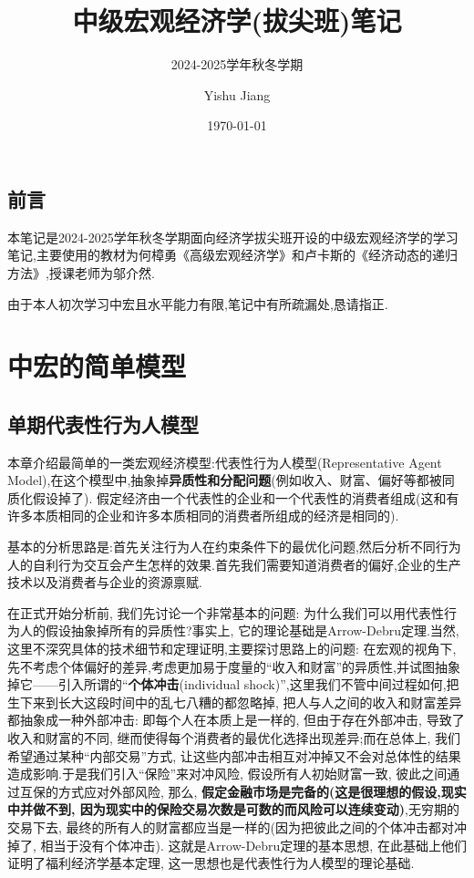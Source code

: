 \documentclass[lang=cn,10pt]{elegantbook}
\title{中级宏观经济学(拔尖班)笔记}
\subtitle{2024-2025学年秋冬学期}
\author{Yishu Jiang}
\institute{School of Economics,Zhejiang University}
\date{\today}
\begin{document}
\maketitle
\frontmatter
\chapter*{前言}
{\fangsong 
    本笔记是2024-2025学年秋冬学期面向经济学拔尖班开设的中级宏观经济学的学习笔记,主要使用的教材为何樟勇《高级宏观经济学》和卢卡斯的《经济动态的递归方法》,授课老师为邬介然.

    由于本人初次学习中宏且水平能力有限,笔记中有所疏漏处,恳请指正.
}
\newpage

\tableofcontents

\mainmatter
\part{中宏的简单模型}
\chapter{单期代表性行为人模型}
本章介绍最简单的一类宏观经济模型:代表性行为人模型(Representative Agent Model),在这个模型中,抽象掉\textbf{异质性和分配问题}(例如收入、财富、偏好等都被同质化假设掉了).
假定经济由一个代表性的企业和一个代表性的消费者组成(这和有许多本质相同的企业和许多本质相同的消费者所组成的经济是相同的).

基本的分析思路是:首先关注行为人在约束条件下的最优化问题,然后分析不同行为人的自利行为交互会产生怎样的效果.首先我们需要知道消费者的偏好,企业的生产技术以及消费者与企业的资源禀赋.

{\kaishu 在正式开始分析前, 我们先讨论一个非常基本的问题: 为什么我们可以用代表性行为人的假设抽象掉所有的异质性?事实上, 它的理论基础是Arrow-Debru定理.当然,这里不深究具体的技术细节和定理证明,主要探讨思路上的问题:
在宏观的视角下,先不考虑个体偏好的差异,考虑更加易于度量的“收入和财富”的异质性,并试图抽象掉它——引入所谓的}“\textbf{个体冲击}(individual shock)”,{\kaishu 这里我们不管中间过程如何,把生下来到长大这段时间中的乱七八糟的都忽略掉, 把人与人之间的收入和财富差异都抽象成一种外部冲击: 即每个人在本质上是一样的, 但由于存在外部冲击, 
导致了收入和财富的不同, 继而使得每个消费者的最优化选择出现差异;而在总体上, 我们希望通过某种“内部交易”方式, 让这些内部冲击相互对冲掉又不会对总体性的结果造成影响.于是我们引入“保险”来对冲风险, 假设所有人初始财富一致, 彼此之间通过互保的方式应对外部风险, 那么, }\textbf{假定金融市场是完备的(这是很理想的假设,现实中并做不到, 因为现实中的保险交易次数是可数的而风险可以连续变动)},{\kaishu 无穷期的交易下去, 最终的所有人的财富都应当是一样的(因为把彼此之间的个体冲击都对冲掉了, 相当于没有个体冲击).
这就是Arrow-Debru定理的基本思想, 在此基础上他们证明了福利经济学基本定理, 这一思想也是代表性行为人模型的理论基础.} 
\end{document}
